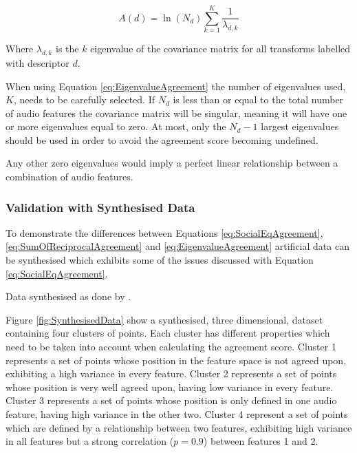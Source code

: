 			\begin{equation}
				A(d) = \ln(N_{d}) \sum_{k = 1}^{K} \frac{1}{\lambda_{d,k}}
				\label{eq:EigenvalueAgreement}
			\end{equation}
			
			Where $\lambda_{d, k}$ is the $k$ eigenvalue of the covariance matrix for all transforms
			labelled with descriptor $d$.

			When using Equation \ref{eq:EigenvalueAgreement} the number of eigenvalues used, $K$, needs to be
			carefully selected. If $N_{d}$ is less than or equal to the total number of audio features the
			covariance matrix will be singular, meaning it will have one or more eigenvalues equal to zero. At
			most, only the $N_{d} - 1$ largest eigenvalues should be used in order to avoid the agreement score
			becoming undefined.

			Any other zero eigenvalues would imply a perfect linear relationship between a combination of audio
			features. 

		\subsubsection*{Validation with Synthesised Data}
			To demonstrate the differences between Equations \ref{eq:SocialEqAgreement},
			\ref{eq:SumOfReciprocalAgreement} and \ref{eq:EigenvalueAgreement} artificial data can be
			synthesised which exhibits some of the issues discussed with Equation \ref{eq:SocialEqAgreement}.
			
			\note
			{
				Data synthesised as done by \citet{ripley1987stochastic}.
			}

			Figure \ref{fig:SynthesisedData} show a synthesised, three dimensional, dataset containing four
			clusters of points. Each cluster has different properties which need to be taken into account when
			calculating the agreement score. Cluster 1 represents a set of points whose position in the feature
			space is not agreed upon, exhibiting a high variance in every feature. Cluster 2 represents a set
			of points whose position is very well agreed upon, having low variance in every feature. Cluster 3
			represents a set of points whose position is only defined in one audio feature, having high
			variance in the other two. Cluster 4 represent a set of points which are defined by a relationship
			between two features, exhibiting high variance in all features but a strong correlation ($p = 0.9$)
			between features 1 and 2.

